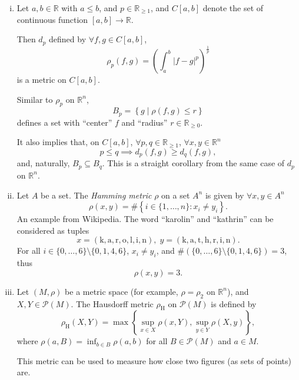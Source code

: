 \begin{example}
\begin{enumerate}[(i)]
		
		\item Let $a,b \in \mathbb R$ with $a \le b$, and $p \in \mathbb R_{\ge 1}$, and $C[a,b]$ denote the set of continuous function $[a,b] \to \mathbb R$.
		
			Then $d_p$ defined by $\forall f, g \in C[a,b]$,
			$$
			\rho_{p}(f,g) = \left( \int_a^b |f - g|^{p} \right)^\frac{1}{p}
			$$
			is a metric on $C[a,b]$.
			
			
			Similar to $\rho_p$ on $\mathbb R^n$,
			$$
			B_{p} = \left\{ g \;|\; \rho(f, g) \le r \right\}
			$$
			defines a set with ``center'' $f$ and ``radius'' $r \in \mathbb R_{\ge 0}$.
			
			It also implies that, on $C[a,b]$, $\forall p, q \in \mathbb R_{\ge 1}$, $\forall x,y \in \mathbb R^n$
			$$
			p \le q \implies d_p(f,g) \ge d_q(f,g),
			$$
			and, naturally, $B_p \subseteq B_q$. This is a straight corollary from the same case of $d_p$ on $\mathbb R^n$.
		
		
		\item Let $A$ be a set. The \textit{Hamming metric} $\rho$ on a set $A^n$ is given by $\forall x,y \in A^n$
			$$
			\rho(x,y) = \# \left\{ i \in \{1, \ldots, n\} : x_i \ne y_i \right\}.
			$$
			An example from Wikipedia. The word ``karolin'' and ``kathrin'' can be considered as tuples
			$$
			x = ( \mathrm{ k, a, r, o, l, i, n } ), \; y = ( \mathrm{k, a, t, h, r, i, n} ).
			$$
			For all $i \in \{0, \ldots, 6\} \setminus \{ 0, 1, 4, 6 \}$, $x_i \ne y_i$, and $\# (\{0, \ldots, 6\} \setminus \{ 0, 1, 4, 6 \}) = 3$, thus
			$$
			\rho(x,y) = 3.
			$$
		
		
		\item Let $(M, \rho)$ be a metric space (for example, $\rho = \rho_2$ on $\mathbb R^n$), and $X, Y \in \mathcal P(M)$. The Hausdorff metric $\rho_\mathrm{H}$ on $\mathcal P(M)$ is defined by
			$$
			\rho_\mathrm{H}(X,Y) = \max \left\{ \sup_{x \in X} \rho(x,Y), \sup_{y \in Y} \rho(X,y) \right\},
			$$
			where $\rho(a, B) = \inf_{b \in B} \rho(a,b)$ for all $B \in \mathcal P(M)$ and $a \in M$.
			
			This metric can be used to measure how close two figures (as sets of points) are.
	\end{enumerate}
\end{example}


